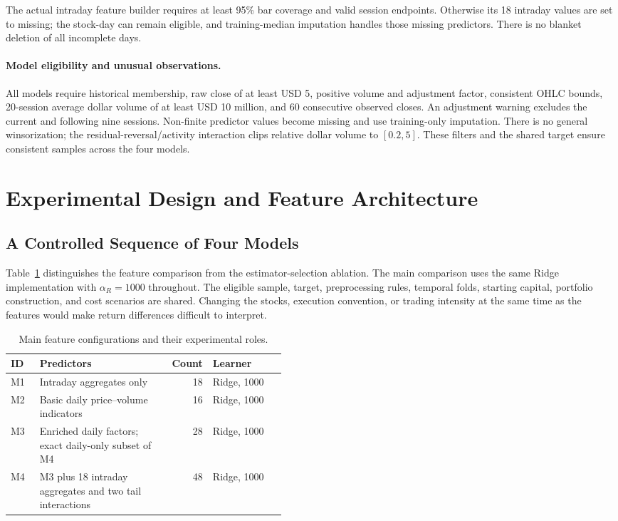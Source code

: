 \documentclass[11pt,a4paper]{article}
\begin{document}
The actual intraday feature builder requires at least 95\% bar coverage and
valid session endpoints. Otherwise its 18 intraday values are set to missing;
the stock-day can remain eligible, and training-median imputation handles
those missing predictors. There is no blanket deletion of all incomplete days.

\paragraph{Model eligibility and unusual observations.}
All models require historical membership, raw close of at least USD 5,
positive volume and adjustment factor, consistent OHLC bounds, 20-session
average dollar volume of at least USD 10 million, and 60 consecutive observed
closes. An adjustment warning excludes the current and following nine
sessions. Non-finite predictor values become missing and use training-only
imputation. There is no general winsorization; the residual-reversal/activity
interaction clips relative dollar volume to $[0.2,5]$. These filters and the
shared target ensure consistent samples across the four models.

\section{Experimental Design and Feature Architecture}
\label{sec:features}
\subsection{A Controlled Sequence of Four Models}
Table~\ref{tab:architecture} distinguishes the feature comparison from the
estimator-selection ablation. The main comparison uses the same Ridge
implementation with $\alpha_R=1000$ throughout. The eligible sample, target,
preprocessing rules, temporal folds, starting capital, portfolio construction,
and cost scenarios are shared. Changing the stocks, execution convention,
or trading intensity at the same time as the features would make return
differences difficult to interpret.

\begin{table}[htbp]\centering\small
\caption{Main feature configurations and their experimental roles.}
\label{tab:architecture}
\begin{tabular}{lp{0.45\linewidth}rl}\toprule
ID & Predictors & Count & Learner\\\midrule
M1 & Intraday aggregates only & 18 & Ridge, 1000\\
M2 & Basic daily price--volume indicators & 16 & Ridge, 1000\\
M3 & Enriched daily factors; exact daily-only subset of M4 & 28 & Ridge, 1000\\
M4 & M3 plus 18 intraday aggregates and two tail interactions & 48 & Ridge, 1000\\\bottomrule
\end{tabular}
\end{table}
\end{document}
